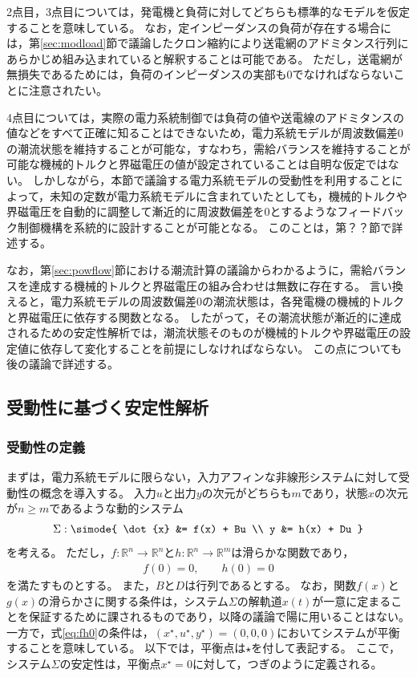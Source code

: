 \documentclass[tombow,dvipdfmx]{corona-a5}
\begin{document}
2点目，3点目については，発電機と負荷に対してどちらも標準的なモデルを仮定することを意味している。
なお，定インピーダンスの負荷が存在する場合には，第\ref{sec:modload}節で議論したクロン縮約により送電網のアドミタンス行列にあらかじめ組み込まれていると解釈することは可能である。
ただし，送電網が無損失であるためには，負荷のインピーダンスの実部も0でなければならないことに注意されたい。

4点目については，実際の電力系統制御では負荷の値や送電線のアドミタンスの値などをすべて正確に知ることはできないため，電力系統モデルが周波数偏差0の潮流状態を維持することが可能な，すなわち，需給バランスを維持することが可能な機械的トルクと界磁電圧の値が設定されていることは自明な仮定ではない。
しかしながら，本節で議論する電力系統モデルの受動性を利用することによって，未知の定数が電力系統モデルに含まれていたとしても，機械的トルクや界磁電圧を自動的に調整して漸近的に周波数偏差を0とするようなフィードバック制御機構を系統的に設計することが可能となる。
このことは，第？？節で詳述する。

なお，第\ref{sec:powflow}節における潮流計算の議論からわかるように，需給バランスを達成する機械的トルクと界磁電圧の組み合わせは無数に存在する。
言い換えると，電力系統モデルの周波数偏差0の潮流状態は，各発電機の機械的トルクと界磁電圧に依存する関数となる。
したがって，その潮流状態が漸近的に達成されるための安定性解析では，潮流状態そのものが機械的トルクや界磁電圧の設定値に依存して変化することを前提にしなければならない。
この点についても後の議論で詳述する。

\subsection{受動性に基づく安定性解析}\label{sec:passstab}

\subsubsection{受動性の定義}

まずは，電力系統モデルに限らない，入力アフィンな非線形システムに対して受動性の概念を導入する。
入力$u$と出力$y$の次元がどちらも$m$であり，状態$x$の次元が$n\geq m$であるような動的システム
\begin{align}\label{eq:nlsig}
\Sigma: \simode{
\dot{x} &= f(x) + Bu \\
y &= h(x) + Du
}
\end{align}
を考える。
ただし，$f:\mathbb{R}^{n} \rightarrow \mathbb{R}^{n}$と$h:\mathbb{R}^{n} \rightarrow \mathbb{R}^{m}$は滑らかな関数であり，
\begin{align}\label{eq:fh0}
f(0)=0,\qquad
h(0)=0
\end{align}
を満たすものとする。
また，$B$と$D$は行列であるとする。
なお，関数$f(x)$と$g(x)$の滑らかさに関する条件は，システム$\Sigma$の解軌道$x(t)$が一意に定まることを保証するために課されるものであり，以降の議論で陽に用いることはない。
一方で，式\ref{eq:fh0}の条件は，$(x^{\star},u^{\star},y^{\star})=(0,0,0)$においてシステムが平衡することを意味している。
以下では，平衡点は$\star$を付して表記する。
ここで，システム$\Sigma$の安定性は，平衡点$x^{\star}=0$に対して，つぎのように定義される。
\end{document}
